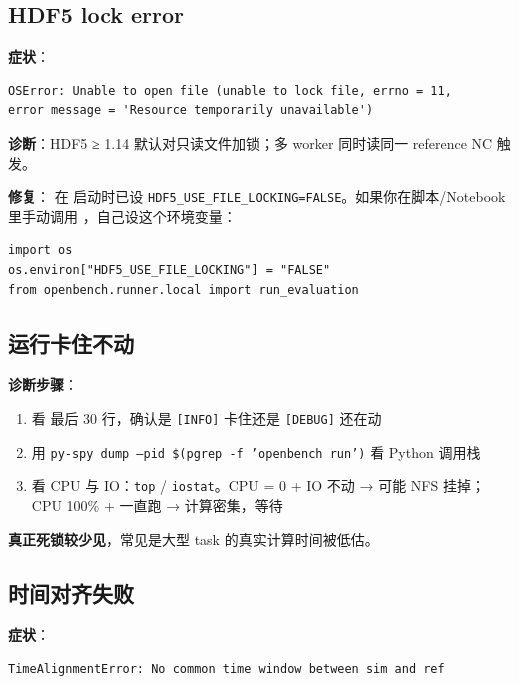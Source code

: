 \subsection{HDF5 lock error}

\textbf{症状}：

\begin{verbatim}
OSError: Unable to open file (unable to lock file, errno = 11,
error message = 'Resource temporarily unavailable')
\end{verbatim}

\textbf{诊断}：HDF5 ≥ 1.14 默认对只读文件加锁；多 worker 同时读同一 reference NC 触发。

\textbf{修复}：\openbench{} 在  启动时已设 \texttt{HDF5\_USE\_FILE\_LOCKING=FALSE}。如果你在脚本/Notebook 里手动调用 ，自己设这个环境变量：

\begin{verbatim}
import os
os.environ["HDF5_USE_FILE_LOCKING"] = "FALSE"
from openbench.runner.local import run_evaluation
\end{verbatim}

\subsection{运行卡住不动}

\textbf{诊断步骤}：

\begin{enumerate}
  \item 看  最后 30 行，确认是 \texttt{[INFO]} 卡住还是 \texttt{[DEBUG]} 还在动
  \item 用 \texttt{py-spy dump --pid \$(pgrep -f 'openbench run')} 看 Python 调用栈
  \item 看 CPU 与 IO：\texttt{top} / \texttt{iostat}。CPU = 0 + IO 不动 → 可能 NFS 挂掉；CPU 100\% + 一直跑 → 计算密集，等待
\end{enumerate}

\textbf{真正死锁较少见}，常见是大型 task 的真实计算时间被低估。

\subsection{时间对齐失败}

\textbf{症状}：

\begin{verbatim}
TimeAlignmentError: No common time window between sim and ref
\end{verbatim}

